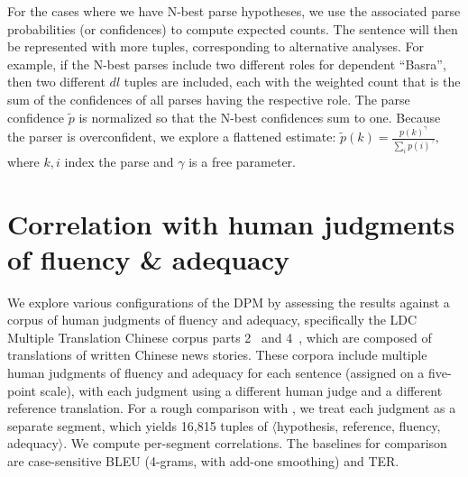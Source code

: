 \documentclass{kluwer}    %
\begin{document}
\begin{article}
For the cases where we have N-best parse hypotheses, we use the associated
parse probabilities (or confidences) to compute expected
counts. The sentence will then be represented with more tuples,
corresponding to alternative analyses. For example, if the N-best
parses include two different roles for dependent ``Basra'', then two
different $dl$ tuples are included, each with the weighted count that is the
sum of the confidences of all parses having the respective role.
The parse confidence $\tilde{p}$ is normalized so that the
N-best confidences sum to one. Because the parser is overconfident, we
explore a flattened estimate: $\tilde{p}(k) =
\frac{p(k)^\gamma}{\sum_ip(i)^\gamma},$ where $k,i$ index the parse and
$\gamma$ is a free parameter.


\section{Correlation with human judgments of fluency \& adequacy}
\label{sec:faexpts}

We explore various configurations of the DPM by assessing the results
against a corpus of human judgments of fluency and adequacy,
specifically the LDC Multiple Translation Chinese corpus parts
2~\cite{LDC03MTC2} and 4~\cite{LDC06MTC4}, which are composed of
translations of written Chinese news stories.  These corpora include
multiple human judgments of fluency and adequacy for each sentence
(assigned on a five-point scale), with each judgment using a different
human judge and a different reference translation.  For a
rough comparison with
, we treat each judgment as a
separate segment, which yields 16,815 tuples of $\langle$hypothesis,
reference, fluency, adequacy$\rangle$.  We compute per-segment
correlations.
%
The baselines for comparison are case-sensitive BLEU (4-grams, with add-one smoothing) and TER. 


\end{article}
\end{document}
